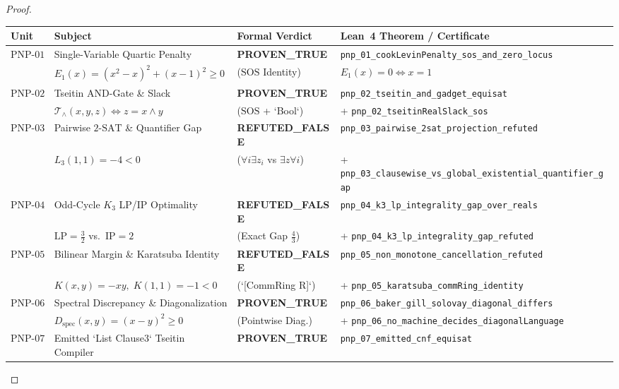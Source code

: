 \documentclass[11pt,a4paper]{article}
\theoremstyle{plain}
\theoremstyle{definition}
\theoremstyle{remark}
\begin{document}
\begin{proof}
\begin{table}[htbp]
\centering
\small
\begin{tabular}{@{}llll@{}}
\toprule
\textbf{Unit} & \textbf{Subject} & \textbf{Formal Verdict} & \textbf{Lean~4 Theorem / Certificate} \\
\midrule
$\mathrm{PNP\text{-}01}$ & Single-Variable Quartic Penalty & \textbf{PROVEN\_TRUE} & \texttt{pnp\_01\_cookLevinPenalty\_sos\_and\_zero\_locus} \\
                         & $E_1(x) = (x^2-x)^2 + (x-1)^2 \ge 0$ & ($\mathrm{SOS}$ Identity) & $E_1(x) = 0 \iff x = 1$ \\
$\mathrm{PNP\text{-}02}$ & Tseitin $\mathrm{AND}$-Gate \& Slack & \textbf{PROVEN\_TRUE} & \texttt{pnp\_02\_tseitin\_and\_gadget\_equisat} \\
                         & $\mathcal{T}_{\land}(x,y,z) \iff z = x\land y$ & ($\mathrm{SOS}$ + `Bool`) & + \texttt{pnp\_02\_tseitinRealSlack\_sos} \\
$\mathrm{PNP\text{-}03}$ & Pairwise $2\text{-SAT}$ \& Quantifier Gap & \textbf{REFUTED\_FALSE} & \texttt{pnp\_03\_pairwise\_2sat\_projection\_refuted} \\
                         & $L_3(1,1) = -4 < 0$ & ($\forall i \exists z_i$ vs $\exists z \forall i$) & + \texttt{pnp\_03\_clausewise\_vs\_global\_existential\_quantifier\_gap} \\
$\mathrm{PNP\text{-}04}$ & Odd-Cycle $K_3$ LP/IP Optimality & \textbf{REFUTED\_FALSE} & \texttt{pnp\_04\_k3\_lp\_integrality\_gap\_over\_reals} \\
                         & $\mathrm{LP} = \frac{3}{2}$ vs.\ $\mathrm{IP} = 2$ & (Exact Gap $\frac{4}{3}$) & + \texttt{pnp\_04\_k3\_lp\_integrality\_gap\_refuted} \\
$\mathrm{PNP\text{-}05}$ & Bilinear Margin \& Karatsuba Identity & \textbf{REFUTED\_FALSE} & \texttt{pnp\_05\_non\_monotone\_cancellation\_refuted} \\
                         & $K(x,y) = -xy,\; K(1,1)=-1<0$ & (`[CommRing R]`) & + \texttt{pnp\_05\_karatsuba\_commRing\_identity} \\
$\mathrm{PNP\text{-}06}$ & Spectral Discrepancy \& Diagonalization & \textbf{PROVEN\_TRUE} & \texttt{pnp\_06\_baker\_gill\_solovay\_diagonal\_differs} \\
                         & $D_{\mathrm{spec}}(x,y) = (x-y)^2 \ge 0$ & (Pointwise Diag.) & + \texttt{pnp\_06\_no\_machine\_decides\_diagonalLanguage} \\
$\mathrm{PNP\text{-}07}$ & Emitted `List Clause3` Tseitin Compiler & \textbf{PROVEN\_TRUE} & \texttt{pnp\_07\_emitted\_cnf\_equisat} \\

\end{tabular}
\end{table}
\end{proof}
\end{document}
